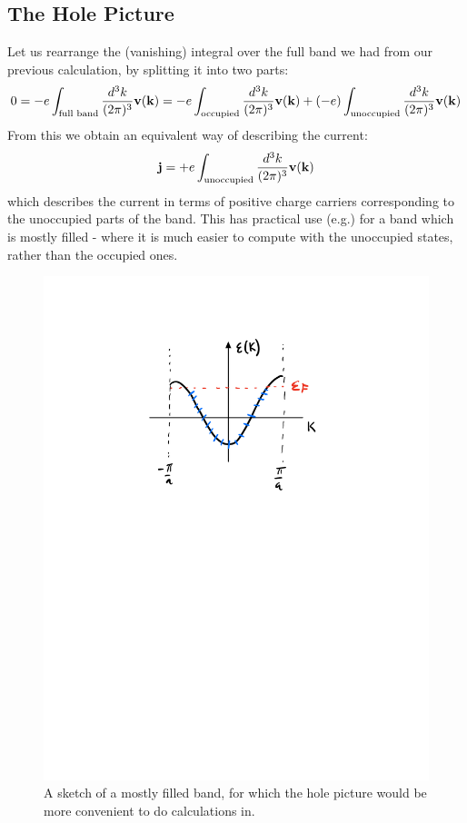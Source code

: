 \subsection{The Hole Picture}
Let us rearrange the (vanishing) integral over the full band we had from our previous calculation, by splitting it into two parts:
\begin{equation}
    0 = -e\int_{\text{full band}}\frac{d^3k}{(2\pi)^3}\mathbf{v}(\mathbf{k}) = -e\int_{\text{occupied}} \frac{d^3k}{(2\pi)^3}\mathbf{v}(\mathbf{k}) + (-e)\int_{\text{unoccupied}}\frac{d^3k}{(2\pi)^3}\mathbf{v}(\mathbf{k})
\end{equation}
From this we obtain an equivalent way of describing the current:
\begin{equation}
    \mathbf{j} = +e\int_{\text{unoccupied}}\frac{d^3k}{(2\pi)^3}\mathbf{v}(\mathbf{k})
\end{equation}
which describes the current in terms of positive charge carriers corresponding to the unoccupied parts of the band. This has practical use (e.g.) for a band which is mostly filled - where it is much easier to compute with the unoccupied states, rather than the occupied ones.

\begin{figure}[htbp]
    \centering
    \includegraphics[scale=0.7]{Images/fig-mostlyfilledband.pdf}
    \caption{A sketch of a mostly filled band, for which the hole picture would be more convenient to do calculations in.}
    \label{fig-mostlyfilledband}
\end{figure}

